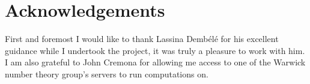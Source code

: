 \documentclass[12pt,a4paper,abstracton,bibtotoc]{scrreprt}
\theoremstyle{definition}
\begin{document}
\section{Acknowledgements}
First and foremost I would like to thank Lassina Demb\'el\'e for his excellent guidance while I undertook the project, it was truly a pleasure to work with him.
I am also grateful to John Cremona for allowing me access to one of the Warwick number theory group's servers to run computations on.


 
%

%

\nocite{*}


\end{document}
